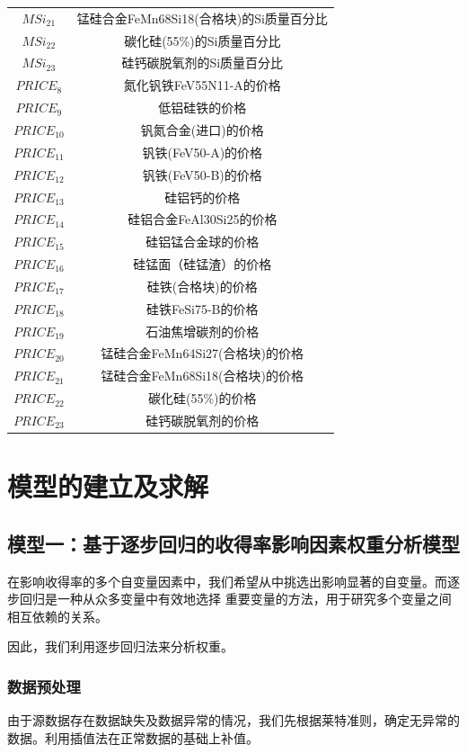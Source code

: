 \documentclass[12pt]{article}%
\begin{document}
\begin{longtable}{|c|c|}
$MSi_{21}$ & 锰硅合金FeMn68Si18(合格块)的Si质量百分比 \\
$MSi_{22}$ & 碳化硅(55\%)的Si质量百分比 \\
$MSi_{23}$ & 硅钙碳脱氧剂的Si质量百分比 \\\hline
$PRICE_{8}$ & 氮化钒铁FeV55N11-A的价格 \\
$PRICE_{9}$ & 低铝硅铁的价格 \\
$PRICE_{10}$ & 钒氮合金(进口)的价格 \\
$PRICE_{11}$ & 钒铁(FeV50-A)的价格 \\
$PRICE_{12}$ & 钒铁(FeV50-B)的价格 \\
$PRICE_{13}$ & 硅铝钙的价格 \\
$PRICE_{14}$ & 硅铝合金FeAl30Si25的价格 \\
$PRICE_{15}$ & 硅铝锰合金球的价格 \\
$PRICE_{16}$ & 硅锰面（硅锰渣）的价格 \\
$PRICE_{17}$ & 硅铁(合格块)的价格 \\
$PRICE_{18}$ & 硅铁FeSi75-B的价格 \\
$PRICE_{19}$ & 石油焦增碳剂的价格 \\
$PRICE_{20}$ & 锰硅合金FeMn64Si27(合格块)的价格 \\
$PRICE_{21}$ & 锰硅合金FeMn68Si18(合格块)的价格 \\
$PRICE_{22}$ & 碳化硅(55\%)的价格 \\
$PRICE_{23}$ & 硅钙碳脱氧剂的价格 \\
\end{longtable}

\section{模型的建立及求解}
\subsection{模型一：基于逐步回归的收得率影响因素权重分析模型}
在影响收得率的多个自变量因素中，我们希望从中挑选出影响显著的自变量。而逐步回归是一种从众多变量中有效地选择
重要变量的方法\cite{zhubuhuigui1}，用于研究多个变量之间相互依赖的关系。

因此，我们利用逐步回归法来分析权重。
\subsubsection{数据预处理}
由于源数据存在数据缺失及数据异常的情况，我们先根据莱特准则，确定无异常的数据。利用插值法在正常数据的基础上补值。
\end{document}

